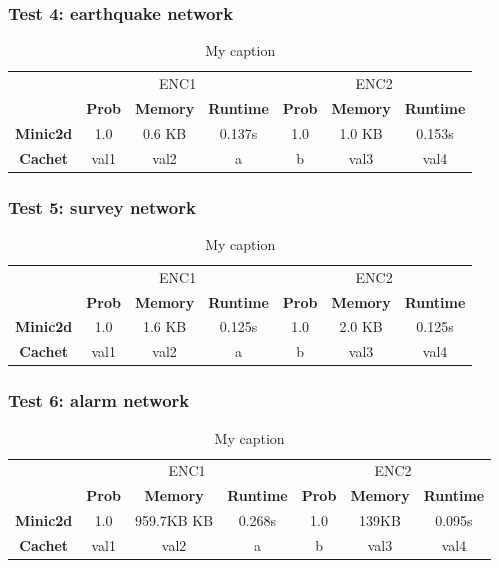 \subsubsection{Test 4: earthquake network}
\begin{table}[H]
\centering
\caption{My caption}
\label{my-label}
\begin{tabular}{c|c|c|c|c|c|c|}
\cline{2-7}
        & \multicolumn{3}{c|}{ENC1} & \multicolumn{3}{c|}{ENC2} \\ \cline{2-7} 
  & \textbf{Prob}  & \textbf{Memory}  & \textbf{Runtime} & \textbf{Prob}  & \textbf{Memory}  & \textbf{Runtime} \\ \cline{1-7} 
  \textbf{Minic2d} & 1.0  & 0.6 KB & 0.137s   & 1.0    & 1.0 KB  & 	0.153s \\
  \hline
\textbf{Cachet}  & val1  & val2    & a       & b     & val3    & val4    \\ \cline{1-7} 
\end{tabular}
\end{table}

\subsubsection{Test 5: survey network}
\begin{table}[H]
\centering
\caption{My caption}
\label{my-label}
\begin{tabular}{c|c|c|c|c|c|c|}
\cline{2-7}
        & \multicolumn{3}{c|}{ENC1} & \multicolumn{3}{c|}{ENC2} \\ \cline{2-7} 
  & \textbf{Prob}  & \textbf{Memory}  & \textbf{Runtime} & \textbf{Prob}  & \textbf{Memory}  & \textbf{Runtime} \\ \cline{1-7} 
  \textbf{Minic2d} & 1.0  & 1.6 KB    & 0.125s   & 1.0    & 2.0 KB    & 	0.125s \\
  \hline
\textbf{Cachet}  & val1  & val2    & a       & b     & val3    & val4    \\ \cline{1-7} 
\end{tabular}
\end{table}

\subsubsection{Test 6: alarm network}
\begin{table}[H]
\centering
\caption{My caption}
\label{my-label}
\begin{tabular}{c|c|c|c|c|c|c|}
\cline{2-7}
        & \multicolumn{3}{c|}{ENC1} & \multicolumn{3}{c|}{ENC2} \\ \cline{2-7} 
  & \textbf{Prob}  & \textbf{Memory}  & \textbf{Runtime} & \textbf{Prob}  & \textbf{Memory}  & \textbf{Runtime} \\ \cline{1-7} 
  \textbf{Minic2d} & 1.0  & 959.7KB KB    & 0.268s   & 1.0    & 139KB    & 	0.095s \\
  \hline
\textbf{Cachet}  & val1  & val2    & a       & b     & val3    & val4    \\ \cline{1-7} 
\end{tabular}
\end{table}

